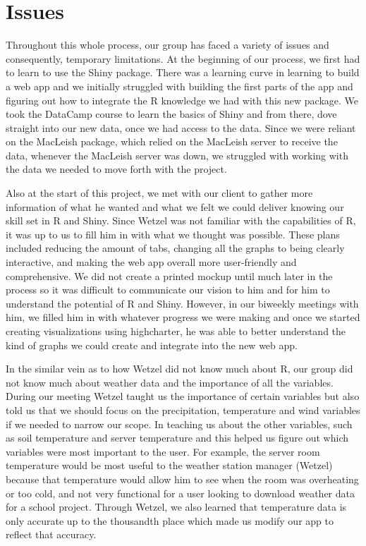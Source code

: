 \documentclass[10pt,letterpaper]{article}
\begin{document}
\section{Issues}\label{issues}

Throughout this whole process, our group has faced a variety of issues
and consequently, temporary limitations. At the beginning of our
process, we first had to learn to use the Shiny package. There was a
learning curve in learning to build a web app and we initially struggled
with building the first parts of the app and figuring out how to
integrate the R knowledge we had with this new package. We took the
DataCamp course to learn the basics of Shiny and from there, dove
straight into our new data, once we had access to the data. Since we
were reliant on the MacLeish package, which relied on the MacLeish
server to receive the data, whenever the MacLeish server was down, we
struggled with working with the data we needed to move forth with the
project.

Also at the start of this project, we met with our client to gather more
information of what he wanted and what we felt we could deliver knowing
our skill set in R and Shiny. Since Wetzel was not familiar with the
capabilities of R, it was up to us to fill him in with what we thought
was possible. These plans included reducing the amount of tabs, changing
all the graphs to being clearly interactive, and making the web app
overall more user-friendly and comprehensive. We did not create a
printed mockup until much later in the process so it was difficult to
communicate our vision to him and for him to understand the potential of
R and Shiny. However, in our biweekly meetings with him, we filled him
in with whatever progress we were making and once we started creating
visualizations using highcharter, he was able to better understand the
kind of graphs we could create and integrate into the new web app.

In the similar vein as to how Wetzel did not know much about R, our
group did not know much about weather data and the importance of all the
variables. During our meeting Wetzel taught us the importance of certain
variables but also told us that we should focus on the precipitation,
temperature and wind variables if we needed to narrow our scope. In
teaching us about the other variables, such as soil temperature and
server temperature and this helped us figure out which variables were
most important to the user. For example, the server room temperature
would be most useful to the weather station manager (Wetzel) because
that temperature would allow him to see when the room was overheating or
too cold, and not very functional for a user looking to download weather
data for a school project. Through Wetzel, we also learned that
temperature data is only accurate up to the thousandth place which made
us modify our app to reflect that accuracy.
\end{document}

